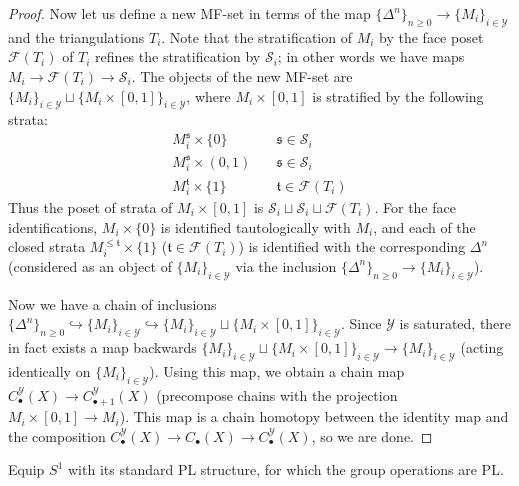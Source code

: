 \documentclass[12pt]{article}
\theoremstyle{definition}
\theoremstyle{remark}
\numberwithin{equation}{subsection}
\newcommand{\F}{\mathcal F}
\newcommand{\s}{\mathfrak s}
\newcommand{\ttt}{\mathfrak t}
\newcommand{\Y}{\mathcal Y}
\newcommand{\SSS}{\mathcal S}
\begin{document}
\begin{proof}
Now let us define a new MF-set in terms of the map $\{\Delta^n\}_{n\geq 0}\to\{M_i\}_{i\in\Y}$ and the triangulations $T_i$.  Note that the stratification of $M_i$ by the face poset $\F(T_i)$ of $T_i$ refines the stratification by $\SSS_i$; in other words we have maps $M_i\to\F(T_i)\to\SSS_i$.  The objects of the new MF-set are $\{M_i\}_{i\in\Y}\sqcup\{M_i\times[0,1]\}_{i\in\Y}$, where $M_i\times[0,1]$ is stratified by the following strata:
\begin{align}
M_i^\s\times\{0\}&\quad\s\in\SSS_i\\
M_i^\s\times(0,1)&\quad\s\in\SSS_i\\
M_i^\ttt\times\{1\}&\quad\ttt\in\F(T_i)
\end{align}
Thus the poset of strata of $M_i\times[0,1]$ is $\SSS_i\sqcup\SSS_i\sqcup\F(T_i)$.  For the face identifications, $M_i\times\{0\}$ is identified tautologically with $M_i$, and each of the closed strata $M_i^{\leq\ttt}\times\{1\}$ ($\ttt\in\F(T_i)$) is identified with the corresponding $\Delta^n$ (considered as an object of $\{M_i\}_{i\in\Y}$ via the inclusion $\{\Delta^n\}_{n\geq 0}\to\{M_i\}_{i\in\Y}$).

Now we have a chain of inclusions $\{\Delta^n\}_{n\geq 0}\hookrightarrow\{M_i\}_{i\in\Y}\hookrightarrow\{M_i\}_{i\in\Y}\sqcup\{M_i\times[0,1]\}_{i\in\Y}$.  Since $\Y$ is saturated, there in fact exists a map backwards $\{M_i\}_{i\in\Y}\sqcup\{M_i\times[0,1]\}_{i\in\Y}\to\{M_i\}_{i\in\Y}$ (acting identically on $\{M_i\}_{i\in\Y}$).  Using this map, we obtain a chain map $C_\bullet^\Y(X)\to C_{\bullet+1}^\Y(X)$ (precompose chains with the projection $M_i\times[0,1]\to M_i$).  This map is a chain homotopy between the identity map and the composition $C_\bullet^\Y(X)\to C_\bullet(X)\to C_\bullet^\Y(X)$, so we are done.
\end{proof}

Equip $S^1$ with its standard PL structure, for which the group operations are PL.
\end{document}
